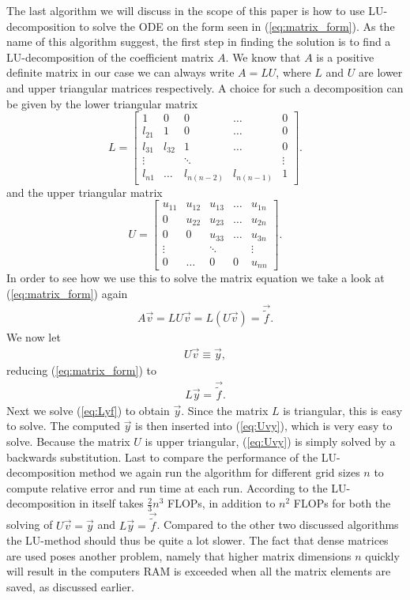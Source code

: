 \documentclass[twocolumn]{aastex62}
\begin{document}
The last algorithm we will discuss in the scope of this paper is how to use LU-decomposition to solve the ODE on the form seen in (\ref{eq:matrix_form}). As the name of this algorithm suggest, the first step in finding the solution is to find a LU-decomposition of the coefficient matrix $A$. We know that $A$ is a positive definite matrix in our case we can always write $A = LU$, where $L$ and $U$ are lower and upper triangular matrices respectively. A choice for such a decomposition can be given by the lower triangular matrix
$$L = 
\begin{bmatrix}
	1 & 0 & 0 & \hdots & 0\\
	l_{21} & 1 & 0 & \hdots & 0\\
	l_{31} & l_{32} & 1 &\hdots & 0\\
	\vdots & & \ddots & & \vdots\\
	l_{n1} & \hdots & l_{n(n-2)} & l_{n(n-1)} & 1
\end{bmatrix}.
$$
and the upper triangular matrix
$$U = 
\begin{bmatrix}
	u_{11} & u_{12} & u_{13} & \hdots & u_{1n}\\
	0 & u_{22} & u_{23} & \hdots & u_{2n}\\
	0 & 0 & u_{33} &\hdots & u_{3n}\\
	\vdots & & \ddots & & \vdots\\
	0 & \hdots & 0 & 0 & u_{nn}
\end{bmatrix}.
$$
In order to see how we use this to solve the matrix equation we take a look at (\ref{eq:matrix_form}) again
\begin{align}
	A\vec{v} = LU\vec{v} = L(U\vec{v}) = \vec{\tilde{f}}.
\end{align}
We now let 
\begin{align}
	U\vec{v} \equiv \vec{y},
	\label{eq:Uvy}
\end{align}
reducing (\ref{eq:matrix_form}) to
\begin{align}
	L\vec{y} = \vec{\tilde{f}}.
	\label{eq:Lyf}
\end{align} 
Next we solve (\ref{eq:Lyf}) to obtain $\vec{y}$. Since the matrix $L$ is triangular, this is easy to solve. The computed $\vec{y}$ is then inserted into (\ref{eq:Uvy}), which is very easy to solve. Because the matrix $U$ is upper triangular, (\ref{eq:Uvy}) is simply solved by a backwards substitution. 
Last to compare the performance of the LU-decomposition method we again run the algorithm for different grid sizes $n$ to compute relative error and run time at each run. According to \citep{Boyd:2004} the LU-decomposition in itself takes $\frac{2}{3}n^3$ FLOPs, in addition to $n^2$ FLOPs for both the solving of $U\vec{v} = \vec{y}$ and $L\vec{y} = \vec{\tilde{f}}$. Compared to the other two discussed algorithms the LU-method should thus be quite a lot slower. The fact that dense matrices are used poses another problem, namely that higher matrix dimensions $n$ quickly will result in the computers RAM is exceeded when all the matrix elements are saved, as discussed earlier.
\end{document}
